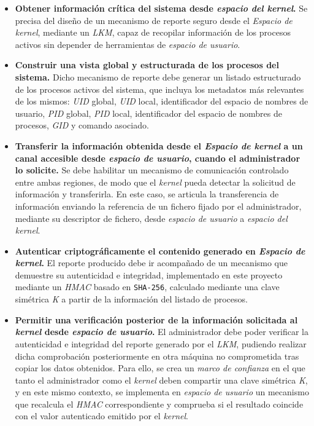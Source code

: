 \begin{itemize}
    \item \textbf{Obtener información crítica del sistema desde \textit{espacio del kernel}.} Se precisa del diseño de un mecanismo de reporte seguro desde el \textit{Espacio de kernel}, mediante un \textit{LKM}, capaz de recopilar información de los procesos activos sin depender de herramientas de \textit{espacio de usuario}.
    \item \textbf{Construir una vista global y estructurada de los procesos del sistema.} Dicho mecanismo de reporte debe generar un listado estructurado de los procesos activos del sistema, que incluya los metadatos más relevantes de los mismos: \textit{UID} global, \textit{UID} local, identificador del espacio de nombres de usuario, \textit{PID} global, \textit{PID} local, identificador del espacio de nombres de procesos, \textit{GID} y comando asociado.
    \item \textbf{Transferir la información obtenida desde el \textit{Espacio de kernel} a un canal accesible desde \textit{espacio de usuario}, cuando el administrador lo solicite.} Se debe habilitar un mecanismo de comunicación controlado entre ambas regiones, de modo que el \textit{kernel} pueda detectar la solicitud de información y transferirla. En este caso, se articula la transferencia de información enviando la referencia de un fichero fijado por el administrador, mediante su descriptor de fichero, desde \textit{espacio de usuario} a \textit{espacio del kernel}.
    \item \textbf{Autenticar criptográficamente el contenido generado en \textit{Espacio de kernel}.} El reporte producido debe ir acompañado de un mecanismo que demuestre su autenticidad e integridad, implementado en este proyecto mediante un \textit{HMAC} basado en \texttt{SHA-256}, calculado mediante una clave simétrica \textit{K} a partir de la información del listado de procesos.
    \item \textbf{Permitir una verificación posterior de la información solicitada al \textit{kernel} desde \textit{espacio de usuario}.} El administrador debe poder verificar la autenticidad e integridad del reporte generado por el \textit{LKM}, pudiendo realizar dicha comprobación posteriormente en otra máquina no comprometida tras copiar los datos obtenidos. Para ello, se crea un \textit{marco de confianza} en el que tanto el administrador como el \textit{kernel} deben compartir una clave simétrica \textit{K}, y en este mismo contexto, se implementa en \textit{espacio de usuario} un mecanismo que recalcula el \textit{HMAC} correspondiente y comprueba si el resultado coincide con el valor autenticado emitido por el \textit{kernel}.

\end{itemize}
